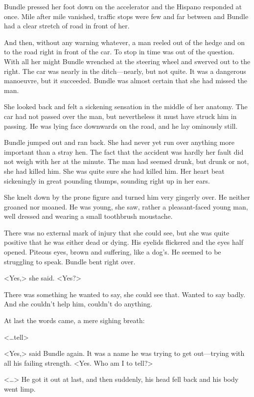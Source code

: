 Bundle pressed her foot down on the accelerator and the Hispano responded at once. Mile after mile vanished, traffic stops were few and far between and Bundle had a clear stretch of road in front of her.

And then, without any warning whatever, a man reeled out of the hedge and on to the road right in front of the car. To stop in time was out of the question. With all her might Bundle wrenched at the steering wheel and swerved out to the right. The car was nearly in the ditch—nearly, but not quite. It was a dangerous manoeuvre, but it succeeded. Bundle was almost certain that she had missed the man.

She looked back and felt a sickening sensation in the middle of her anatomy. The car had not passed over the man, but nevertheless it must have struck him in passing. He was lying face downwards on the road, and he lay ominously still.

Bundle jumped out and ran back. She had never yet run over anything more important than a stray hen. The fact that the accident was hardly her fault did not weigh with her at the minute. The man had seemed drunk, but drunk or not, she had killed him. She was quite sure she had killed him. Her heart beat sickeningly in great pounding thumps, sounding right up in her ears.

She knelt down by the prone figure and turned him very gingerly over. He neither groaned nor moaned. He was young, she saw, rather a pleasant-faced young man, well dressed and wearing a small toothbrush moustache.

There was no external mark of injury that she could see, but she was quite positive that he was either dead or dying. His eyelids flickered and the eyes half opened. Piteous eyes, brown and suffering, like a dog's. He seemed to be struggling to speak. Bundle bent right over.

<Yes,> she said. <Yes?>

There was something he wanted to say, she could see that. Wanted to say badly. And she couldn't help him, couldn't do anything.

At last the words came, a mere sighing breath:

<\dots tell\longdots>

<Yes,> said Bundle again. It was a name he was trying to get out—trying with all his failing strength. <Yes. Who am I to tell?>

<\dots {}\longdots> He got it out at last, and then suddenly, his head fell back and his body went limp.

